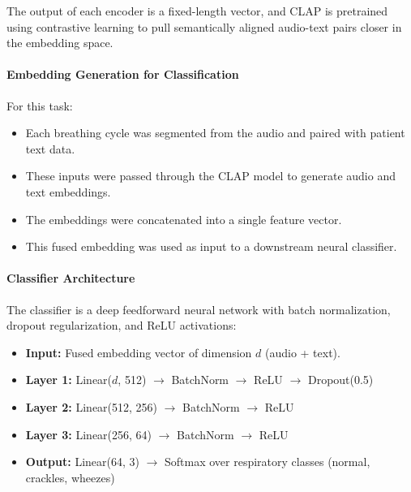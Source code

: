 The output of each encoder is a fixed-length vector, and CLAP is pretrained using contrastive learning to pull semantically aligned audio-text pairs closer in the embedding space.

\paragraph{Embedding Generation for Classification}
For this task:
\begin{itemize}
    \item Each breathing cycle was segmented from the audio and paired with patient text data.
    \item These inputs were passed through the CLAP model to generate audio and text embeddings.
    \item The embeddings were concatenated into a single feature vector.
    \item This fused embedding was used as input to a downstream neural classifier.
\end{itemize}

\paragraph{Classifier Architecture}
The classifier is a deep feedforward neural network with batch normalization, dropout regularization, and ReLU activations:
\begin{itemize}
    \item \textbf{Input:} Fused embedding vector of dimension $d$ (audio + text).
    \item \textbf{Layer 1:} Linear($d$, 512) $\rightarrow$ BatchNorm $\rightarrow$ ReLU $\rightarrow$ Dropout(0.5)
    \item \textbf{Layer 2:} Linear(512, 256) $\rightarrow$ BatchNorm $\rightarrow$ ReLU
    \item \textbf{Layer 3:} Linear(256, 64) $\rightarrow$ BatchNorm $\rightarrow$ ReLU
    \item \textbf{Output:} Linear(64, 3) $\rightarrow$ Softmax over respiratory classes (normal, crackles, wheezes)
\end{itemize}

